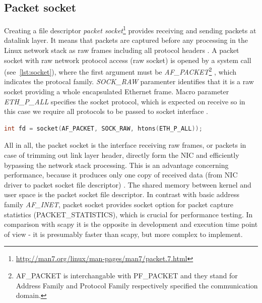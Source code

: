 \documentclass[12pt,a4paper,twoside]{report}
\begin{document}
		\subsection{Packet socket} \label{analysis:mechs:socket}
			Creating a file descriptor \emph{packet socket}\footnote{\url{http://man7.org/linux/man-pages/man7/packet.7.html}} provides receiving and sending packets at datalink layer. It means that packets are captured before any processing in the Linux network stack as raw frames including all protocol headers \cite{man:packet}. A packet socket with raw network protocol access (raw socket) is opened by a system call (see~\autoref{lst:socket}), where the first argument must be \emph{AF\_PACKET}\footnote{AF\_PACKET is interchangable with PF\_PACKET and they stand for Address Family and Protocol Family respectively specified the communication domain.\cite{man:socket}} \cite{man:socket}, which indicates the protocal family. \emph{SOCK\_RAW} paramenter identifies that it is a raw socket providing a whole encapsulated Ethernet frame. Macro parameter \emph{ETH\_P\_ALL} specifies the socket protocol, which is expected on receive so in this case we require all protocols to be passed to socket interface \cite{man:packet}.
			\begin{lstlisting}[language=C, style=appendix, caption=Raw socket system call, label=lst:socket]
int fd = socket(AF_PACKET, SOCK_RAW, htons(ETH_P_ALL));
			\end{lstlisting}
			\par
			All in all, the packet socket is the interface receiving raw frames, or packets in case of trimming out link layer header, directly form the NIC and efficiently bypassing the network stack processing. This is an advantage concerning performance, because it produces only one copy of received data (from NIC driver to packet socket file descriptor) \cite{thesis:muni}\cite{web:raw_socket}. The shared memory between kernel and user space is the packet socket file descriptor. In contrast with basic address family \emph{AF\_INET}, packet socket provides socket option for packet capture statistics (PACKET\_STATISTICS), which is crucial for performance testing. In comparison with scapy it is the opposite in development and execution time point of view - it is presumably faster than scapy, but more complex to implement.\par
\end{document}
